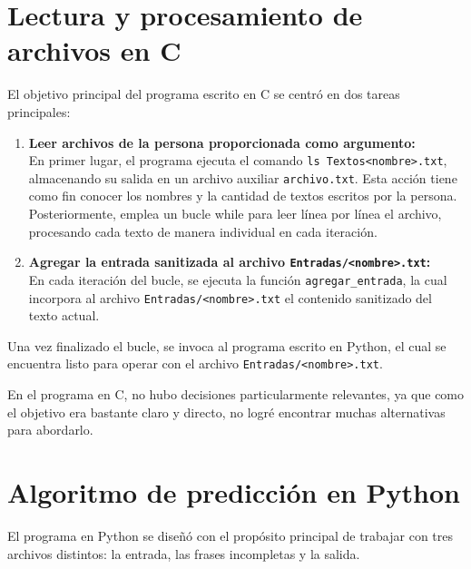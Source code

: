 \documentclass{article}
\begin{document}



\section{Lectura y procesamiento de archivos en C}
El objetivo principal del programa escrito en C se centró en dos tareas principales:

\begin{enumerate}
    \item \textbf{Leer archivos de la persona proporcionada como argumento:} \\
    En primer lugar, el programa ejecuta el comando \texttt{ls Textos<nombre>.txt}, almacenando su salida en un archivo auxiliar 
    \texttt{archivo.txt}. Esta acción tiene como fin conocer los nombres y la cantidad de textos escritos por la persona. Posteriormente, emplea un bucle while para leer línea por línea el archivo, procesando cada texto de manera individual en cada iteración.

    \item \textbf{Agregar la entrada sanitizada al archivo \texttt{Entradas/<nombre>.txt}:} \\
    En cada iteración del bucle, se ejecuta la función \texttt{agregar\_entrada}, la cual incorpora al archivo 
    \texttt{Entradas/<nombre>.txt} el contenido sanitizado del texto actual.
\end{enumerate}

Una vez finalizado el bucle, se invoca al programa escrito en Python, el cual se encuentra listo para operar
 con el archivo \texttt{Entradas/<nombre>.txt}.

En el programa en C, no hubo decisiones particularmente relevantes, ya que como el objetivo era bastante claro y directo, no logré encontrar muchas alternativas para abordarlo.

\section{Algoritmo de predicción en Python}
El programa en Python se diseñó con el propósito principal de trabajar con tres archivos distintos: la entrada, las frases incompletas y la salida.
\end{document}
